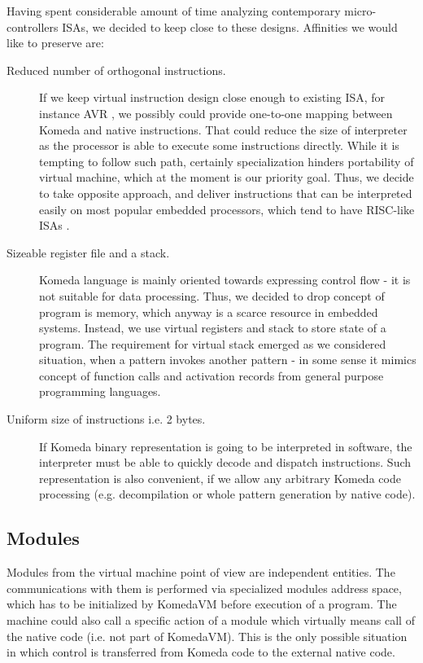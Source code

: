 \documentclass{article}
\begin{document}
Having spent considerable amount of time analyzing contemporary
micro-controllers ISAs, we decided to keep close to these designs. Affinities we
would like to preserve are:

\begin{description}
  \item[Reduced number of orthogonal instructions.]If we keep virtual instruction
    design close enough to existing ISA, for instance AVR \cite{avr}, we possibly
    could provide one-to-one mapping between Komeda and native instructions. That
    could reduce the size of interpreter as the processor is able to execute some
    instructions directly. While it is tempting to follow such path, certainly
    specialization hinders portability of virtual machine, which at the moment is
    our priority goal. Thus, we decide to take opposite approach, and deliver
    instructions that can be interpreted easily on most popular embedded
    processors, which tend to have RISC-like ISAs \cite{risc}.

  \item[Sizeable register file and a stack.] Komeda language is mainly oriented
    towards expressing control flow - it is not suitable for data processing.
    Thus, we decided to drop concept of program is memory, which anyway is a
    scarce resource in embedded systems. Instead, we use virtual registers and
    stack to store state of a program. The requirement for virtual stack emerged
    as we considered situation, when a pattern invokes another pattern - in some
    sense it mimics concept of function calls and activation records from
    general purpose programming languages.

  \item[Uniform size of instructions i.e. 2 bytes.] If Komeda binary
    representation is going to be interpreted in software, the interpreter must
    be able to quickly decode and dispatch instructions. Such representation is
    also convenient, if we allow any arbitrary Komeda code processing (e.g.
    decompilation or whole pattern generation by native code).
\end{description}

\subsection{Modules}

Modules from the virtual machine point of view are  independent entities. The
communications with them is performed via specialized modules address space,
which has to be initialized by KomedaVM before execution of a program. The
machine could also call a specific action of a module which virtually means
call of the native code (i.e. not part of KomedaVM). This is the only possible
situation in which control is transferred from Komeda code to the external
native code.
\end{document}
